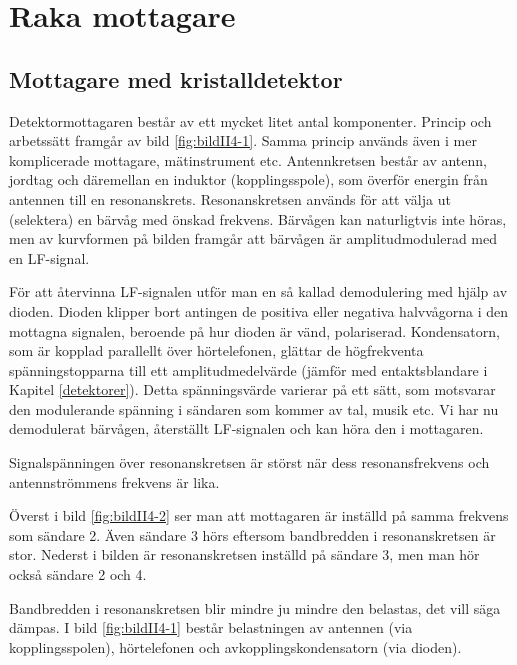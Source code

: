 \section{Raka mottagare}

\subsection{Mottagare med kristalldetektor}


Detektormottagaren består av ett mycket litet antal komponenter.
Princip och arbetssätt framgår av bild \ref{fig:bildII4-1}.
Samma princip används även i mer komplicerade mottagare, mätinstrument etc.
Antennkretsen består av antenn, jordtag och däremellan en induktor
(kopplingsspole), som överför energin från antennen till en resonanskrets.
Resonanskretsen används för att välja ut (selektera) en bärvåg med önskad
frekvens.
Bärvågen kan naturligtvis inte höras, men av kurvformen på bilden framgår
att bärvågen är amplitudmodulerad med en LF-signal.

För att återvinna LF-signalen utför man en så kallad demodulering med hjälp
av dioden.
Dioden klipper bort antingen de positiva eller negativa halvvågorna i den
mottagna signalen, beroende på hur dioden är vänd, polariserad.
Kondensatorn, som är kopplad parallellt över hörtelefonen, glättar de
högfrekventa spänningstopparna till ett amplitudmedelvärde (jämför med
entaktsblandare i Kapitel \ref{detektorer}).
Detta spänningsvärde varierar på ett sätt, som motsvarar den modulerande
spänning i sändaren som kommer av tal, musik etc.
Vi har nu demodulerat bärvågen, återställt LF-signalen och kan höra den i
mottagaren.

Signalspänningen över resonanskretsen är störst när dess
resonansfrekvens och antennströmmens frekvens är lika.

\newpage
{}

Överst i bild \ref{fig:bildII4-2} ser man att mottagaren är inställd på
samma frekvens som sändare 2.
Även sändare 3 hörs eftersom bandbredden i resonanskretsen är stor.
Nederst i bilden är resonanskretsen inställd på sändare 3, men man hör
också sändare 2 och 4.

Bandbredden i resonanskretsen blir mindre ju mindre den belastas,
det vill säga dämpas.
I bild \ref{fig:bildII4-1} består belastningen av antennen (via
kopplingsspolen), hörtelefonen och avkopplingskondensatorn (via dioden).

